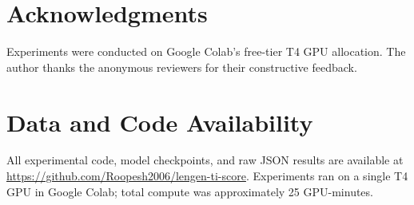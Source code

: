 \documentclass[10pt,twocolumn]{article}
\begin{document}
\section*{Acknowledgments}
Experiments were conducted on Google Colab's free-tier T4 GPU allocation.
The author thanks the anonymous reviewers for their constructive feedback.

\section*{Data and Code Availability}
All experimental code, model checkpoints, and raw JSON results are available at \url{https://github.com/Roopesh2006/lengen-ti-score}.
Experiments ran on a single T4 GPU in Google Colab; total compute was approximately 25 GPU-minutes.



\end{document}
